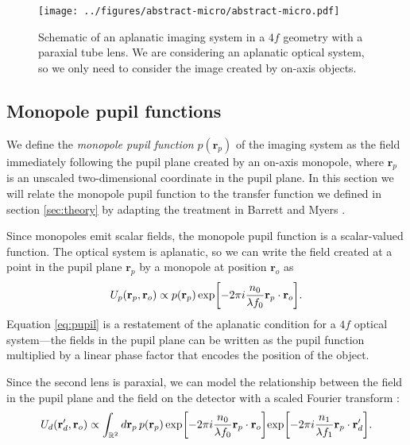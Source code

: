 \documentclass[]{osa-article}
\let\originalleft\left
\let\originalright\right
\renewcommand{\left}{\mathopen{}\mathclose\bgroup\originalleft}
\renewcommand{\right}{\aftergroup\egroup\originalright}
\providecommand{\ro}{\mathbf{\mathbf{r}}_o}
\providecommand{\rp}{\mathbf{r}_p}
\providecommand{\rd}{\mathbf{r}_d}
\providecommand{\mbb}[1]{\mathbb{#1}}
\begin{document}
\begin{figure}[h]
 \centering
   \centering
   \texttt{[image: ../figures/abstract-micro/abstract-micro.pdf]}
   \caption{Schematic of an aplanatic imaging system in a $4f$ geometry with a
     paraxial tube lens. We are considering an aplanatic optical system, so we
     only need to consider the image created by on-axis objects.}
   \label{fig:schematic}
 \end{figure}

\subsection{Monopole pupil functions}
We define the \textit{monopole pupil function} $p(\rp)$ of the imaging system as
the field immediately following the pupil plane created by an on-axis monopole,
where $\rp$ is an unscaled two-dimensional coordinate in the pupil plane. In
this section we will relate the monopole pupil function to the transfer function
we defined in section \ref{sec:theory} by adapting the treatment in Barrett and
Myers \cite[ch.~9.7]{barrett2004}.

Since monopoles emit scalar fields, the monopole pupil function is a
scalar-valued function. The optical system is aplanatic, so we can write the
field created at a point in the pupil plane $\rp$ by a monopole at position
$\ro$ as
\begin{align}
   U_p(\rp, \ro) \propto p(\rp)\,\text{exp}\left[-2\pi i \frac{n_0}{\lambda f_0} \rp\cdot\ro \right]. \label{eq:pupil}
\end{align}
Equation \eqref{eq:pupil} is a restatement of the aplanatic condition for a $4f$
optical system---the fields in the pupil plane can be written as the pupil
function multiplied by a linear phase factor that encodes the position of the
object.

Since the second lens is paraxial, we can model the relationship between the
field in the pupil plane and the field on the detector with a scaled Fourier
transform \cite{goodman1996, axelrod2012, backer2014}:
\begin{align}
   U_d(\rd', \ro) \propto \int_{\mbb{R}^2}d\rp\, p(\rp)\,\text{exp}\left[-2\pi i \frac{n_0}{\lambda f_0} \rp\cdot\ro \right]\text{exp}\left[-2\pi i \frac{n_1}{\lambda f_1} \rp\cdot\rd' \right]. \label{eq:detectorfourier}
\end{align}
\end{document}
